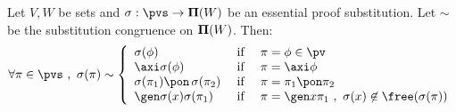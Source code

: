 \begin{prop}\label{logic:prop:FUAP:esssubstprop:charac}
Let $V,W$ be sets and $\sigma:\pvs\to{\bf\Pi}(W)$ be an essential
proof substitution. Let $\sim$ be the substitution congruence on
${\bf\Pi}(W)$. Then:
    \[
    \forall\pi\in\pvs\ ,\ \sigma(\pi)\sim\left\{
                    \begin{array}{lcl}
                    \sigma(\phi)&\mbox{\ if\ }&\pi=\phi\in\pv\\
                    \axi\sigma(\phi)&\mbox{\ if\ }&\pi=\axi\phi\\
                    \sigma(\pi_{1})\pon\,\sigma(\pi_{2})&\mbox{\ if\ }&
                    \pi=\pi_{1}\pon\pi_{2}\\
                    \gen\sigma(x)\sigma(\pi_{1})
                    &\mbox{\ if\ }&\pi=\gen x\pi_{1}\ ,\
                    \sigma(x)\not\in\free(\sigma(\pi))\\
                    \end{array}\right.
    \]
\end{prop}
